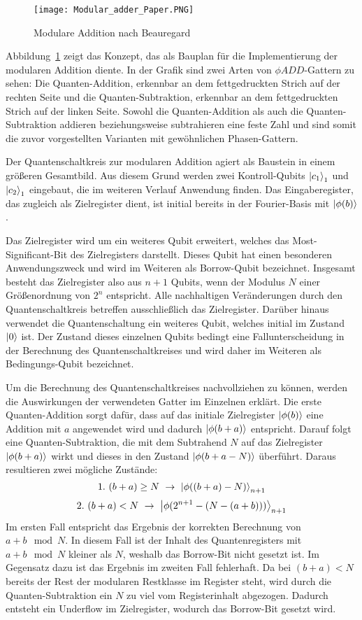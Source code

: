 \begin{figure}[H]
  \centering
  \texttt{[image: Modular\_adder\_Paper.PNG]}
  \caption{Modulare Addition nach Beauregard~\cite{beauregard2003circuit}}
  \label{fig:modulare_addition_paper}
\end{figure}
Abbildung~\ref{fig:modulare_addition_paper} zeigt das Konzept, 
das als Bauplan für die Implementierung der modularen Addition diente.
In der Grafik sind zwei Arten von \(\phi ADD\)-Gattern zu sehen:
Die Quanten-Addition, erkennbar an dem fettgedruckten Strich auf der rechten Seite 
und die Quanten-Subtraktion, erkennbar an dem fettgedruckten Strich auf der linken Seite.
Sowohl die Quanten-Addition als auch die Quanten-Subtraktion addieren beziehungsweise subtrahieren eine feste Zahl und 
sind somit die zuvor vorgestellten Varianten mit gewöhnlichen Phasen-Gattern.

Der Quantenschaltkreis zur modularen Addition agiert als Baustein in einem größeren Gesamtbild. 
Aus diesem Grund werden zwei Kontroll-Qubits \(\ket{c_1}_1\) und \(\ket{c_2}_1\) eingebaut, 
die im weiteren Verlauf Anwendung finden.
Das Eingaberegister, das zugleich als Zielregister dient,  
ist initial bereits in der Fourier-Basis mit \(\ket{\phi(b)}\).

Das Zielregister wird um ein weiteres Qubit erweitert, 
welches das Most-Significant-Bit des Zielregisters darstellt.
Dieses Qubit hat einen besonderen Anwendungszweck und wird im Weiteren als Borrow-Qubit bezeichnet.
Insgesamt besteht das Zielregister also aus \(n+1\) Qubits, 
wenn der Modulus \(N\) einer Größenordnung von \(2^n\) entspricht.
Alle nachhaltigen Veränderungen durch den Quantenschaltkreis betreffen ausschließlich das Zielregister.
Darüber hinaus verwendet die Quantenschaltung ein weiteres Qubit, 
welches initial im Zustand \(\ket{0}\) ist.
Der Zustand dieses einzelnen Qubits bedingt eine Fallunterscheidung in der Berechnung des Quantenschaltkreises und 
wird daher im Weiteren als Bedingungs-Qubit bezeichnet. 

Um die Berechnung des Quantenschaltkreises nachvollziehen zu können, 
werden die Auswirkungen der verwendeten Gatter im Einzelnen erklärt.
Die erste Quanten-Addition sorgt dafür, 
dass auf das initiale Zielregister \(\ket{\phi(b)}\) eine Addition mit \(a\) angewendet wird und 
dadurch \(\ket{\phi(b + a)}\) entspricht.
Darauf folgt eine Quanten-Subtraktion, 
die mit dem Subtrahend \(N\) auf das Zielregister \(\ket{\phi(b + a)}\) wirkt und 
dieses in den Zustand \(\ket{\phi(b + a - N)}\) überführt. 
Daraus resultieren zwei mögliche Zustände:
\[1.~(b+a) \geq N~\rightarrow~\ket{\phi((b+a) - N)}_{n+1}\]
\[2.~
(b+a) < N~\rightarrow~\ket{\phi(2^{n+1}-(N-(a+b)))}_{n+1}
  \]
Im ersten Fall entspricht das Ergebnis der korrekten Berechnung von \(a+b \mod N\).
In diesem Fall ist der Inhalt des Quantenregisters mit \(a+b \mod N\) kleiner als \(N\), 
weshalb das Borrow-Bit nicht gesetzt ist.
Im Gegensatz dazu ist das Ergebnis im zweiten Fall fehlerhaft.
Da bei \((b+a) < N\) bereits der Rest der modularen Restklasse im Register steht, 
wird durch die Quanten-Subtraktion ein \(N\) zu viel vom Registerinhalt abgezogen.
Dadurch entsteht ein Underflow im Zielregister, 
wodurch das Borrow-Bit gesetzt wird.

